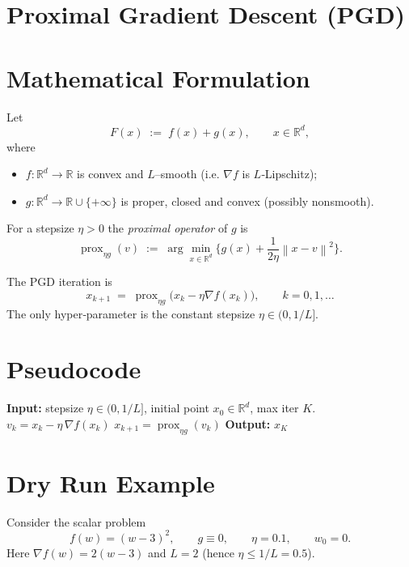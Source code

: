 \documentclass{article}
\newcommand{\prox}{\operatorname{prox}}
\newcommand{\grad}{\nabla}
\newcommand{\R}{\mathbb{R}}
\newcommand{\norm}[1]{\left\lVert #1 \right\rVert}
\begin{document}
\section*{Proximal Gradient Descent (PGD)}

\section*{Mathematical Formulation}
Let  
\[
F(x)\;:=\;f(x)+g(x),\qquad x\in\R^{d},
\]
where  

\begin{itemize}[noitemsep]
\item $f:\R^{d}\to\R$ is convex and $L$–smooth (i.e. $\grad f$ is $L$‑Lipschitz);
\item $g:\R^{d}\to\R\cup\{+\infty\}$ is proper, closed and convex (possibly nonsmooth).
\end{itemize}
For a stepsize $\eta>0$ the \emph{proximal operator} of $g$ is  
\[
\prox_{\eta g}(v)
   \;:=\;\arg\min_{x\in\R^{d}}\Big\{ g(x)+\frac{1}{2\eta}\norm{x-v}^{2}\Big\}.
\]

The PGD iteration is
\begin{equation}\label{eq:update}
x_{k+1}\;=\;\prox_{\eta g}\bigl(x_{k}-\eta \grad f(x_{k})\bigr),\qquad k=0,1,\dots
\end{equation}
The only hyper‑parameter is the constant stepsize $\eta\in(0,1/L]$.

\section*{Pseudocode}
\begin{algorithm}[H]
\caption{Proximal Gradient Descent}
\begin{algorithmic}[1]
\STATE \textbf{Input:} stepsize $\eta\in(0,1/L]$, initial point $x_{0}\in\R^{d}$, max iter $K$.
    \STATE $v_{k}=x_{k}-\eta\,\grad f(x_{k})$ \hfill{}
    \STATE $x_{k+1}= \prox_{\eta g}(v_{k})$ \hfill{}
\ENDFOR
\STATE \textbf{Output:} $x_{K}$
\end{algorithmic}
\end{algorithm}

\section*{Dry Run Example}
Consider the scalar problem 
\[
f(w)=(w-3)^{2},\qquad g\equiv0,\qquad \eta=0.1,\qquad w_{0}=0.
\]
Here $\grad f(w)=2(w-3)$ and $L=2$ (hence $\eta\le 1/L=0.5$).
\end{document}
